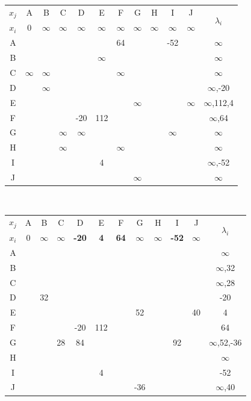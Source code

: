 \documentclass[12pt]{article}
\begin{document}
\begin{enumerate}
\begin{center}
\begin{tabular}{|c|c|c|c|c|c|c|c|c|c|c|c|}
\hline
$x_j$ & A & B & C & D & E & F & G & H & I & J & \multirow{2}{*}{$\lambda_i$} \\ \cline{1-11}
$x_i$ & 0 & $\infty$ & $\infty$ & \textbf{$\infty$} & \textbf{$\infty$} & \textbf{$\infty$} &$\infty$ &$\infty$ & \textbf{$\infty$} & $\infty$ &  \\ \hline
A &  &  &  &  &  & 64 &  &  & -52 &  & $\infty$ \\ \hline
B &  &  &  &  & $\infty$ &  &  &  &  &  & $\infty$ \\ \hline
C & $\infty$ & $\infty$ &  &  &  & $\infty$ &  &  &  &  & $\infty$ \\ \hline
D &  & \textbf{$\infty$} &  &  &  &  &  &  &  &  & $\infty$,-20 \\ \hline
E &  &  &  &  &  &  & $\infty$ &  &  & $\infty$ & $\infty$,112,4 \\ \hline
F &  &  &  & -20 & 112 &  &  &  &  &  & $\infty$,64 \\ \hline
G &  &  & $\infty$ & $\infty$ &  &  &  &  & $\infty$ &  & $\infty$ \\ \hline
H &  &  & $\infty$ &  &  & $\infty$ &  &  &  &  & $\infty$ \\ \hline
I &  &  &  &  & 4 &  &  &  &  &  & $\infty$,-52 \\ \hline
J &  &  &  &  &  &  &$\infty$&  &  &  & $\infty$ \\ \hline
\end{tabular}\\
 \vspace{0.3cm}

\begin{tabular}{|c|c|c|c|c|c|c|c|c|c|c|c|}
\hline
$x_j$ & A & B & C & D & E & F & G & H & I & J & \multirow{2}{*}{$\lambda_i$} \\ \cline{1-11}
$x_i$ & 0 & $\infty$ & $\infty$& \textbf{-20} & \textbf{4} & \textbf{64} & $\infty$ & $\infty$ & \textbf{-52} & $\infty$ &  \\ \hline
A &  &  &  &  &  &  &  &  &  &  & $\infty$ \\ \hline
B &  &  &  &  &  &  &  &  &  &  & $\infty$,32 \\ \hline
C &  &  &  &  &  &  &  &  &  &  & $\infty$,28 \\ \hline
D &  & 32 &  &  &  &  &  &  &  &  & -20 \\ \hline
E &  &  &  &  &  &  & 52 &  &  & 40 & 4 \\ \hline
F &  &  &  & -20 & 112 &  &  &  &  &  & 64 \\ \hline
G &  &  & 28 & 84 &  &  &  &  & 92 &  & $\infty$,52,-36 \\ \hline
H &  &  &  &  &  &  &  &  &  &  & $\infty$ \\ \hline
I &  &  &  &  & 4 &  &  &  &  &  & -52 \\ \hline
J &  &  &  &  &  &  & -36 &  &  &  & $\infty$,40 \\ \hline
\end{tabular}\\
\vspace{0.3cm}


\end{center}
\end{enumerate}
\end{document}
